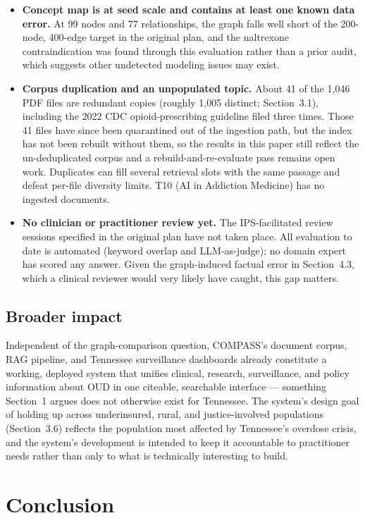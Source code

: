 \documentclass[11pt]{article}
\begin{document}
\begin{itemize}[leftmargin=*]
  \item \textbf{Concept map is at seed scale and contains at least one known data error.} At 99 nodes and 77 relationships, the graph falls well short of the 200-node, 400-edge target in the original plan, and the naltrexone contraindication was found through this evaluation rather than a prior audit, which suggests other undetected modeling issues may exist.
  \item \textbf{Corpus duplication and an unpopulated topic.} About 41 of the 1{,}046 PDF files are redundant copies (roughly 1{,}005 distinct; Section~3.1), including the 2022 CDC opioid-prescribing guideline filed three times. Those 41 files have since been quarantined out of the ingestion path, but the index has not been rebuilt without them, so the results in this paper still reflect the un-deduplicated corpus and a rebuild-and-re-evaluate pass remains open work. Duplicates can fill several retrieval slots with the same passage and defeat per-file diversity limits. T10 (AI in Addiction Medicine) has no ingested documents.
  \item \textbf{No clinician or practitioner review yet.} The IPS-facilitated review sessions specified in the original plan have not taken place. All evaluation to date is automated (keyword overlap and LLM-as-judge); no domain expert has scored any answer. Given the graph-induced factual error in Section~4.3, which a clinical reviewer would very likely have caught, this gap matters.
\end{itemize}

\subsection{Broader impact}

Independent of the graph-comparison question, COMPASS's document corpus, RAG pipeline, and Tennessee surveillance dashboards already constitute a working, deployed system that unifies clinical, research, surveillance, and policy information about OUD in one citeable, searchable interface --- something Section~1 argues does not otherwise exist for Tennessee. The system's design goal of holding up across underinsured, rural, and justice-involved populations (Section~3.6) reflects the population most affected by Tennessee's overdose crisis, and the system's development is intended to keep it accountable to practitioner needs rather than only to what is technically interesting to build.

\section{Conclusion}
\end{document}
